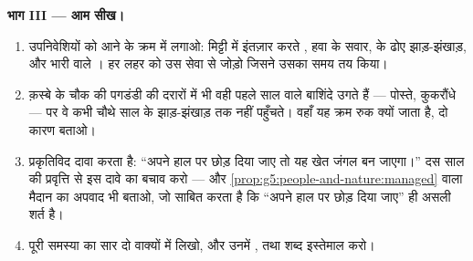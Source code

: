 \begin{problem}
\medskip\noindent\textbf{भाग III --- आम सीख।}
\begin{enumerate}[resume]
  \item उपनिवेशियों को आने के क्रम में लगाओ: मिट्टी में इंतज़ार करते
        , हवा के सवार,  के ढोए झाड़-झंखाड़, और भारी  वाले
        । हर लहर को उस  सेवा से जोड़ो जिसने उसका समय तय
        किया।
  \item क़स्बे के चौक की पगडंडी की दरारों में भी वही पहले साल वाले
        बाशिंदे उगते हैं --- पोस्ते, कुकरौंधे --- पर वे कभी चौथे साल
        के झाड़-झंखाड़ तक नहीं पहुँचते। वहाँ यह क्रम रुक क्यों जाता है,
        दो कारण बताओ।
  \item प्रकृतिविद दावा करता है: ``अपने हाल पर छोड़ दिया जाए तो यह
        खेत जंगल बन जाएगा।'' दस साल की प्रवृत्ति से इस दावे का बचाव
        करो --- और \cref{prop:g5:people-and-nature:managed} वाला
        मैदान का अपवाद भी बताओ, जो साबित करता है कि ``अपने हाल पर
        छोड़ दिया जाए'' ही असली शर्त है।
  \item पूरी समस्या का सार दो वाक्यों में लिखो, और उनमें
        \emph{}, \emph{} तथा \emph{}
        शब्द इस्तेमाल करो।
\end{enumerate}
\end{problem}
